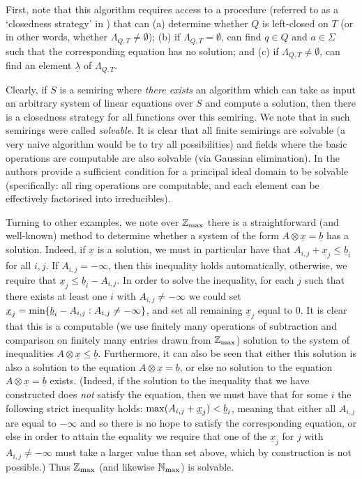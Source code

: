 \documentclass{lmcs}
\numberwithin{theorem}{section}
\begin{document}
First, note that this algorithm requires  access to a procedure (referred to as a `closedness strategy' in \cite{HKRS20}) that can (a) determine whether $Q$ is left-closed on $T$ (or in other words, whether $\Lambda_{Q,T} \neq \emptyset$); (b) if $\Lambda_{Q,T} = \emptyset$, can find $q \in Q$ and $a \in \Sigma$ such that the corresponding equation has no solution; and (c)  if $\Lambda_{Q,T} \neq \emptyset$, can find an element $\underline{\lambda}$ of $\Lambda_{Q, T}$. 

Clearly, if $S$ is a semiring where \emph{there exists} an algorithm which can take as input an arbitrary system of linear equations over $S$ and compute a solution, then there is a closedness strategy for all functions over this semiring.  We note that in \cite{HKRS20} such semirings were called \emph{solvable}. It is clear that all finite semirings are solvable (a very naive algorithm would be to try all possibilities) and fields where the basic operations are computable are also solvable (via Gaussian elimination). In \cite{HKRS20} the authors provide a sufficient condition for a principal ideal domain to be solvable (specifically: all ring operations are computable, and each element can be effectively factorised into irreducibles). 

\begin{rem}Turning to other examples,  we note over $\mathbb{Z}_{\rm max}$ there is a straightforward (and well-known)  method to determine whether a system of the form $A \otimes \underline{x} = \underline{b}$ has a solution. Indeed, if $\underline{x}$ is a solution, we must in particular have that $A_{i,j} + \underline{x}_j \leq \underline{b}_i$ for all $i,j$. If $A_{i,j} = -\infty$,  then this inequality holds automatically, otherwise, we require that $\underline{x}_j \leq \underline{b}_i - A_{i,j}$. In order to solve the inequality, for each $j$ such that there exists at least one $i$ with $A_{i,j}\neq -\infty$ we could set $\underline{x}_j = {\rm min}\{\underline{b}_i-A_{i,j}: A_{i,j} \neq -\infty\}$, and set all remaining $\underline{x}_j$ equal to $0$. It is clear that this is a computable (we use finitely many operations of subtraction and comparison on finitely many entries drawn from $\mathbb{Z}_{\rm max}$) solution to the system of inequalities $A \otimes \underline{x} \leq \underline{b}$. Furthermore, it can also be seen that either this solution  is also a solution to the equation $A \otimes \underline{x} = \underline{b}$, or else no solution to the equation $A \otimes \underline{x} = \underline{b}$ exists. (Indeed, if the solution to the inequality that we have constructed does \emph{not} satisfy the equation, then we must have that for some $i$ the following strict inequality holds: ${\rm max} (A_{i,j} +\underline{x}_j) < \underline{b}_i$, meaning that either all $A_{i,j}$ are equal to $-\infty$ and so there is no hope to satisfy the corresponding equation, or else in order to attain the equality we require that one of the $\underline{x}_j$ for $j$ with $A_{i,j} \neq -\infty$ must take a larger value than set above, which by construction is not possible.) Thus $\mathbb{Z}_{\rm max}$ (and likewise $\mathbb{N}_{\rm max}$) is solvable.
\end{rem}
\end{document}
